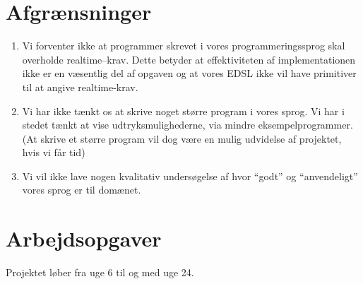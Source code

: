 \documentclass[a4paper,oneside, draft]{memoir}
\begin{document}
\section{Afgrænsninger}
\begin{enumerate}
\item Vi forventer ikke at programmer skrevet i vores
  programmeringssprog skal overholde realtime--krav. Dette betyder at
  effektiviteten af implementationen ikke er en væsentlig del af
  opgaven og at vores EDSL ikke vil have primitiver til at angive
  realtime-krav.
\item Vi har ikke tænkt os at skrive noget større program i vores sprog. Vi har
  i stedet tænkt at vise udtryksmulighederne, via mindre eksempelprogrammer. (At
  skrive et større program vil dog være en mulig udvidelse af projektet, hvis vi
  får tid)
\item Vi vil ikke lave nogen kvalitativ undersøgelse af hvor "`godt"'
  og "`anvendeligt"' vores sprog er til domænet.
\end{enumerate}

\section{Arbejdsopgaver}
Projektet løber fra uge 6 til og med uge 24.
\end{document}
